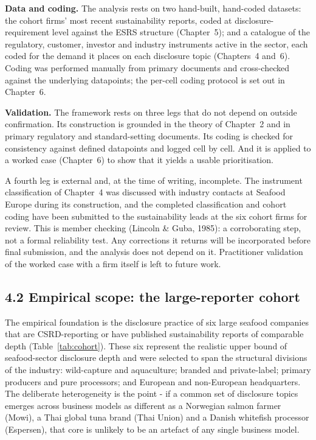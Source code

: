 \documentclass[
]{article}
\begin{document}
\textbf{Data and coding.} The analysis rests on two hand-built, hand-coded datasets:
the cohort firms' most recent sustainability reports, coded at
disclosure-requirement level against the ESRS structure (Chapter~5); and a catalogue
of the regulatory, customer, investor and industry instruments active in the sector,
each coded for the demand it places on each disclosure topic (Chapters~4 and~6).
Coding was performed manually from primary documents and cross-checked against the
underlying datapoints; the per-cell coding protocol is set out in Chapter~6.

\textbf{Validation.}\label{framework-validation-strategy} The framework rests on
three legs that do not depend on outside confirmation. Its construction is grounded
in the theory of Chapter~2 and in primary regulatory and standard-setting documents.
Its coding is checked for consistency against defined datapoints and logged
cell by cell. And it is applied to a worked case (Chapter~6) to show that it
yields a usable prioritisation.

A fourth leg is external and, at the time of writing, incomplete. The instrument
classification of Chapter~4 was discussed with industry contacts at Seafood Europe
during its construction, and the completed classification and cohort coding have
been submitted to the sustainability leads at the six cohort firms for review. This
is member checking (Lincoln \& Guba, 1985): a corroborating step, not a formal
reliability test. Any corrections it returns will be incorporated before final
submission, and the analysis does not depend on it. Practitioner validation of the
worked case with a firm itself is left to future work.


\iffalse %
\subsection{4.2 Empirical scope: the large-reporter
cohort}\label{empirical-scope-the-large-reporter-cohort}

The empirical foundation is the disclosure practice of six large
seafood companies that are CSRD-reporting or have published
sustainability reports of comparable depth (Table~\ref{tab:cohort}).
These six represent the realistic upper bound of seafood-sector
disclosure depth and were selected to span the structural divisions of
the industry: wild-capture and aquaculture; branded and private-label;
primary producers and pure processors; and European and non-European
headquarters. The deliberate heterogeneity is the point - if a common
set of disclosure topics emerges across business models as different as a
Norwegian salmon farmer (Mowi), a Thai global tuna brand (Thai Union) and
a Danish whitefish processor (Espersen), that core is unlikely to be an
artefact of any single business model.
\end{document}
